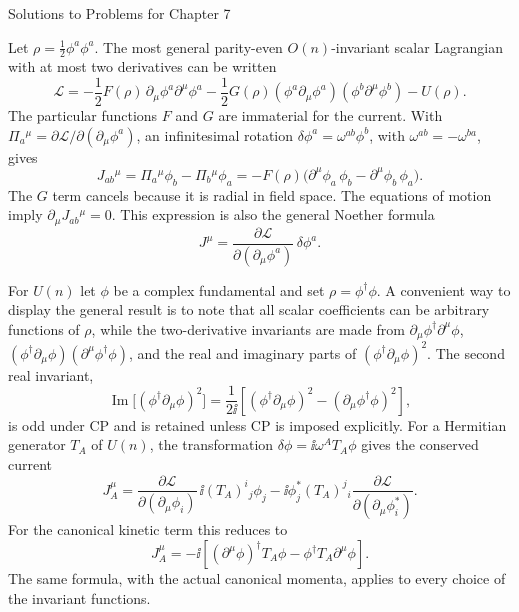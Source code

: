 \begin{bankssolutions}{Solutions to Problems for Chapter 7}

Let $\rho=\frac12\phi^a\phi^a$.  The most general parity-even
$O(n)$-invariant scalar Lagrangian with at most two derivatives can be
written
\[
 \mathcal L=-\frac12F(\rho)\,\partial_\mu\phi^a\partial^\mu\phi^a
 -\frac12G(\rho)
 (\phi^a\partial_\mu\phi^a)(\phi^b\partial^\mu\phi^b)-U(\rho).
\]
The particular functions $F$ and $G$ are immaterial for the current.  With
$\Pi_a{}^\mu=\partial\mathcal L/\partial(\partial_\mu\phi^a)$, an infinitesimal
rotation $\delta\phi^a=\omega^{ab}\phi^b$, with
$\omega^{ab}=-\omega^{ba}$, gives
\[
 J_{ab}{}^\mu=\Pi_a{}^\mu\phi_b-\Pi_b{}^\mu\phi_a
 =-F(\rho)\bigl(\partial^\mu\phi_a\,\phi_b
 -\partial^\mu\phi_b\,\phi_a\bigr).
\]
The $G$ term cancels because it is radial in field space.  The equations of
motion imply $\partial_\mu J_{ab}{}^\mu=0$.  This expression is also the
general Noether formula
\[
 J^\mu=\frac{\partial\mathcal L}{\partial(\partial_\mu\phi^a)}
 \,\delta\phi^a.
\]

For $U(n)$ let $\phi$ be a complex fundamental and set
$\rho=\phi^\dagger\phi$.  A convenient way to display the general result is
to note that all scalar coefficients can be arbitrary functions of $\rho$,
while the two-derivative invariants are made from
$\partial_\mu\phi^\dagger\partial^\mu\phi$,
$(\phi^\dagger\partial_\mu\phi)(\partial^\mu\phi^\dagger\phi)$, and the
real and imaginary parts of $(\phi^\dagger\partial_\mu\phi)^2$.  The second
real invariant,
\[
 \operatorname{Im}\bigl[(\phi^\dagger\partial_\mu\phi)^2\bigr]
 =\frac{1}{2\ii}\left[
 (\phi^\dagger\partial_\mu\phi)^2
 -(\partial_\mu\phi^\dagger\phi)^2\right],
\]
is odd under CP and is retained unless CP is imposed explicitly.  For a
Hermitian generator $T_A$ of $U(n)$, the transformation
$\delta\phi=\ii\omega^A T_A\phi$ gives the conserved current
\begin{equation*}
 J_A^\mu=
 \frac{\partial\mathcal L}{\partial(\partial_\mu\phi_i)}
 \,\ii(T_A)^i{}_{j}\phi_j
 -\ii\phi_j^*(T_A)^j{}_{i}
 \frac{\partial\mathcal L}{\partial(\partial_\mu\phi_i^*)}.
\end{equation*}
For the canonical kinetic term this reduces to
\[
 J_A^\mu=-\ii\left[(\partial^\mu\phi)^\dagger T_A\phi
 -\phi^\dagger T_A\partial^\mu\phi\right].
\]
The same formula, with the actual canonical momenta, applies to every
choice of the invariant functions.


\end{bankssolutions}
